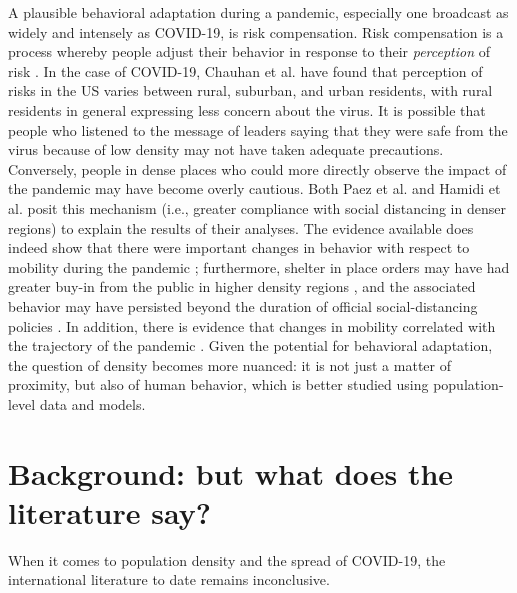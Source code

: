 \documentclass[preprint, 3p,
authoryear]{elsarticle} %
\begin{document}
A plausible behavioral adaptation during a pandemic, especially one
broadcast as widely and intensely as COVID-19, is risk compensation.
Risk compensation is a process whereby people adjust their behavior in
response to their \emph{perception} of risk
\citep{Noland1995perceived, Richens2000condoms, Phillips2011risk}. In
the case of COVID-19, Chauhan et al. \citep{Chauhan2021covid} have found
that perception of risks in the US varies between rural, suburban, and
urban residents, with rural residents in general expressing less concern
about the virus. It is possible that people who listened to the message
of leaders saying that they were safe from the virus because of low
density may not have taken adequate precautions. Conversely, people in
dense places who could more directly observe the impact of the pandemic
may have become overly cautious. Both Paez et al.
\citeyearpar{Paez2020spatio} and Hamidi et al.
\citeyearpar{Hamidi2020density} posit this mechanism (i.e., greater
compliance with social distancing in denser regions) to explain the
results of their analyses. The evidence available does indeed show that
there were important changes in behavior with respect to mobility during
the pandemic
\citep{Jamal2020Changes, Harris2021Changes, Molloy2020Tracing};
furthermore, shelter in place orders may have had greater buy-in from
the public in higher density regions
\citep{Feyman2020effectiveness, Hamidi2021compact}, and the associated
behavior may have persisted beyond the duration of official
social-distancing policies \citep{Praharaj2020Using}. In addition, there
is evidence that changes in mobility correlated with the trajectory of
the pandemic \citep{Paez2020using, Noland2021mobility}. Given the
potential for behavioral adaptation, the question of density becomes
more nuanced: it is not just a matter of proximity, but also of human
behavior, which is better studied using population-level data and
models.

\hypertarget{background-but-what-does-the-literature-say}{%
\section{Background: but what does the literature
say?}\label{background-but-what-does-the-literature-say}}

When it comes to population density and the spread of COVID-19, the
international literature to date remains inconclusive.
\end{document}
